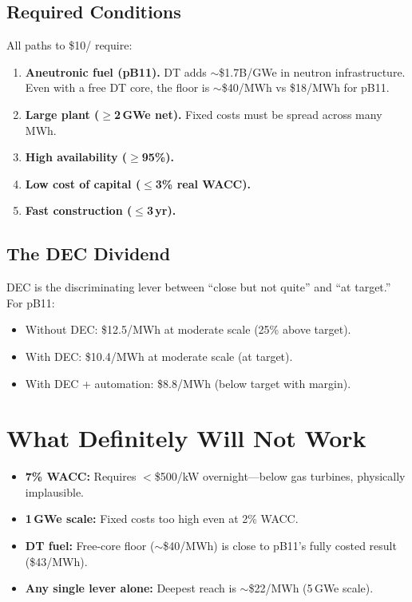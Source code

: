 \documentclass[11pt,a4paper]{article}
\newcommand{\target}{\$10/\text{MWh}}
\begin{document}
\subsection{Required Conditions}

All paths to \target{} require:

\begin{enumerate}
\item \textbf{Aneutronic fuel (pB11).}  DT adds $\sim$\$1.7B/GWe in
  neutron infrastructure.  Even with a free DT core, the floor is
  $\sim$\$40/MWh vs \$18/MWh for pB11.
\item \textbf{Large plant ($\geq$2\,GWe net).}  Fixed costs must be
  spread across many MWh.
\item \textbf{High availability ($\geq$95\%).}
\item \textbf{Low cost of capital ($\leq$3\% real WACC).}
\item \textbf{Fast construction ($\leq$3\,yr).}
\end{enumerate}

\subsection{The DEC Dividend}

DEC is the discriminating lever between ``close but not quite'' and
``at target.''  For pB11:
\begin{itemize}
\item Without DEC: \$12.5/MWh at moderate scale (25\% above target).
\item With DEC: \$10.4/MWh at moderate scale (at target).
\item With DEC + automation: \$8.8/MWh (below target with margin).
\end{itemize}


\section{What Definitely Will Not Work}

\begin{itemize}
\item \textbf{7\% WACC:} Requires $<$\$500/kW overnight---below gas
  turbines, physically implausible.
\item \textbf{1\,GWe scale:} Fixed costs too high even at 2\% WACC.
\item \textbf{DT fuel:} Free-core floor ($\sim$\$40/MWh) is close to
  pB11's fully costed result (\$43/MWh).
\item \textbf{Any single lever alone:} Deepest reach is $\sim$\$22/MWh
  (5\,GWe scale).
\end{itemize}
\end{document}
